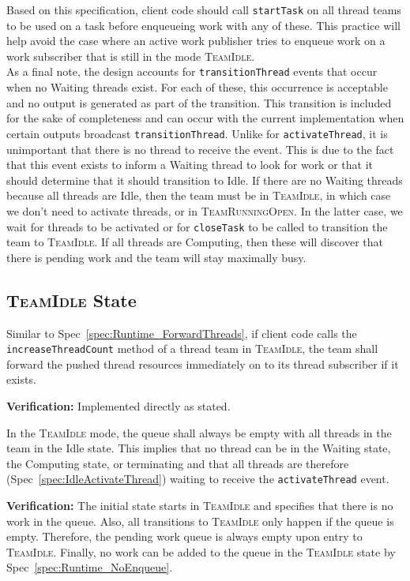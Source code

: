\documentclass{article}
\newcommand{\TeamIdle}          {\textsc{TeamIdle}}
\newcommand{\TeamRunningOpen}   {\textsc{TeamRunningOpen}}
\begin{document}
Based on this specification, client code should call \texttt{startTask} on all
thread teams to be used on a task before enqueueing work with any of these.  This
practice will help avoid the case where an active work publisher tries to
enqueue work on a work subscriber that is still in the mode \TeamIdle.\\

As a final note, the design accounts for \texttt{transitionThread} events that
occur when no Waiting threads exist.  For each of these, this occurrence is
acceptable and no output is generated as part of the transition.  This
transition is included for the sake of completeness and can occur with the
current implementation when certain outputs broadcast \texttt{transitionThread}.
Unlike for \texttt{activateThread}, it is unimportant that there is no thread to
receive the event.  This is due to the fact that this event exists to inform a
Waiting thread to look for work or that it should determine that it should
transition to Idle.  If there are no Waiting threads because all threads are
Idle, then the team must be in \TeamIdle, in which case we don't need to
activate threads, or in \TeamRunningOpen.  In the latter case, we wait for
threads to be activated or for \texttt{closeTask} to be called to transition
the team to \TeamIdle.  If all threads are Computing, then these will discover
that there is pending work and the team will stay maximally busy.

\subsection{{\TeamIdle} State}
\begin{spec}
Similar to Spec~\ref{spec:Runtime_ForwardThreads}, if client code calls the
\texttt{increaseThreadCount} method of a thread team in \TeamIdle, the team shall
forward the pushed thread resources immediately on to its thread subscriber if
it exists.
\end{spec}
\textbf{Verification:}\hspace{0.125in}  Implemented directly as stated.

\begin{spec}
In the {\TeamIdle} mode, the queue shall always be empty with all threads in the
team in the Idle state.  This implies that no thread can be in the Waiting
state, the Computing state, or terminating and that all threads are therefore
(Spec~\ref{spec:IdleActivateThread}) waiting to receive the
\texttt{activateThread} event.
\end{spec}
\textbf{Verification:}\hspace{0.125in}  The initial state starts in {\TeamIdle}
and specifies that there is no work in the queue.  Also, all transitions to
{\TeamIdle} only happen if the queue is empty.  Therefore, the pending work
queue is always empty upon entry to \TeamIdle.  Finally, no work can be added to
the queue in the {\TeamIdle} state by Spec~\ref{spec:Runtime_NoEnqueue}.\\
\end{document}
